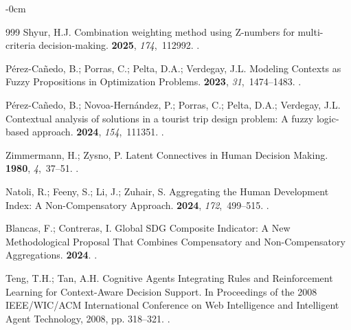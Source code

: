 \documentclass[mathematics,article,submit,moreauthors]{Definitions/mdpi}
\begin{document}
\begin{adjustwidth}{-\extralength}{0cm}
\begin{thebibliography}{999}
    Shyur, H.J.
    \newblock Combination weighting method using Z-numbers for multi-criteria
    decision-making.
     {\bf 2025}, {\em 174},~112992.
    .
    
    P{\'{e}}rez-Ca{\~{n}}edo, B.; Porras, C.; Pelta, D.A.; Verdegay, J.L.
    \newblock Modeling Contexts as Fuzzy Propositions in Optimization Problems.
     {\bf 2023}, {\em
        31},~1474--1483.
    .
    
    Pérez-Cañedo, B.; Novoa-Hernández, P.; Porras, C.; Pelta, D.A.; Verdegay,
    J.L.
    \newblock Contextual analysis of solutions in a tourist trip design problem: A
    fuzzy logic-based approach.
     {\bf 2024}, {\em 154},~111351.
    .
    
    Zimmermann, H.; Zysno, P.
    \newblock Latent Connectives in Human Decision Making.
     {\bf 1980}, {\em 4},~37--51.
    .
    
    Natoli, R.; Feeny, S.; Li, J.; Zuhair, S.
    \newblock Aggregating the Human Development Index: A Non-Compensatory Approach.
     {\bf 2024}, {\em 172},~499--515.
    .
    
    Blancas, F.; Contreras, I.
    \newblock Global {SDG} Composite Indicator: A New Methodological Proposal That
    Combines Compensatory and Non-Compensatory Aggregations.
     {\bf 2024}.
    .

    Teng, T.H.; Tan, A.H.
    \newblock Cognitive Agents Integrating Rules and Reinforcement Learning for
    Context-Aware Decision Support.
    \newblock In Proceedings of the 2008 IEEE/WIC/ACM International Conference on
    Web Intelligence and Intelligent Agent Technology, 2008, pp. 318--321.
    .


\end{thebibliography}
\end{adjustwidth}
\end{document}
